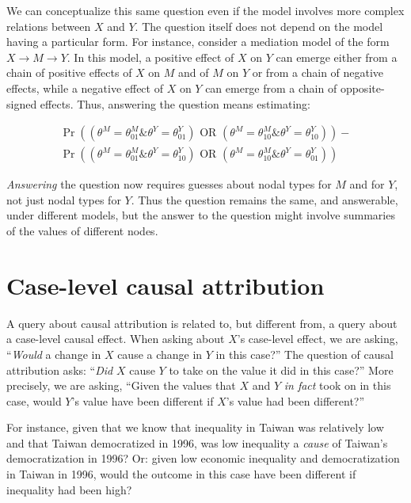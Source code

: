 \documentclass[
  12pt,
]{book}
\begin{document}
We can conceptualize this same question even if the model involves more complex relations between \(X\) and \(Y\). The question itself does not depend on the model having a particular form. For instance, consider a mediation model of the form \(X\rightarrow M \rightarrow Y\). In this model, a positive effect of \(X\) on \(Y\) can emerge either from a chain of positive effects of \(X\) on \(M\) and of \(M\) on \(Y\) or from a chain of negative effects, while a negative effect of \(X\) on \(Y\) can emerge from a chain of opposite-signed effects. Thus, answering the question means estimating:

\begin{equation}
\begin{split}
\Pr((\theta^M = \theta^M_{01} \& \theta^Y = \theta^Y_{01})  \text{ OR }  (\theta^M = \theta^M_{10} \& \theta^Y = \theta^Y_{10}))   - \\
\Pr((\theta^M = \theta^M_{01} \& \theta^Y = \theta^Y_{10})  \text{ OR }  (\theta^M = \theta^M_{10} \& \theta^Y = \theta^Y_{01}))
\end{split}
\end{equation}

\emph{Answering} the question now requires guesses about nodal types for \(M\) and for \(Y\), not just nodal types for \(Y\). Thus the question remains the same, and answerable, under different models, but the answer to the question might involve summaries of the values of different nodes.

\hypertarget{case-level-causal-attribution}{%
\section{Case-level causal attribution}\label{case-level-causal-attribution}}

A query about causal attribution is related to, but different from, a query about a case-level causal effect. When asking about \(X\)'s case-level effect, we are asking, ``\emph{Would} a change in \(X\) cause a change in \(Y\) in this case?'' The question of causal attribution asks: ``\emph{Did} \(X\) cause \(Y\) to take on the value it did in this case?'' More precisely, we are asking, ``Given the values that \(X\) and \(Y\) \emph{in fact} took on in this case, would \(Y\)'s value have been different if \(X\)'s value had been different?''

For instance, given that we know that inequality in Taiwan was relatively low and that Taiwan democratized in 1996, was low inequality a \emph{cause} of Taiwan's democratization in 1996? Or: given low economic inequality and democratization in Taiwan in 1996, would the outcome in this case have been different if inequality had been high?
\end{document}
